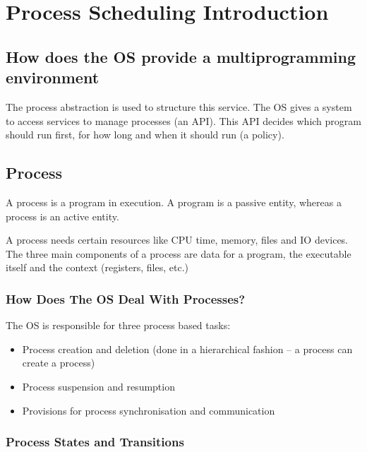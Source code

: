 \section{Process Scheduling Introduction}\label{sec:process_scheduling_introduction}

\subsection{How does the OS provide a multiprogramming environment}\label{sub:how_does_the_os_provide_a_multiprogramming_environment}

The process abstraction is used to structure this service.
The OS gives a system to access services to manage processes (an API).
This API decides which program should run first, for how long and when it should run (a policy).

\subsection{Process}\label{sub:process}

A process is a program in execution.
A program is a passive entity, whereas a process is an active entity.

A process needs certain resources like CPU time, memory, files and IO devices.
The three main components of a process are data for a program, the executable itself and the context (registers, files, etc.)

\subsubsection{How Does The OS Deal With Processes?}\label{ssub:how_does_the_os_deal_with_processes}

The OS is responsible for three process based tasks:
\begin{itemize}
    \item Process creation and deletion (done in a hierarchical fashion -- a process can create a process)
    \item Process suspension and resumption
    \item Provisions for process synchronisation and communication
\end{itemize}

\subsubsection{Process States and Transitions}\label{ssub:process_states_and_transitions}

